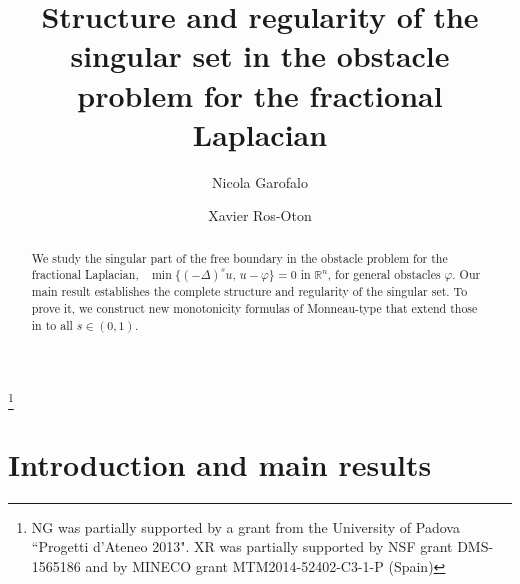 \documentclass[11pt]{amsart}
\theoremstyle{plain}
\numberwithin{equation}{section}
\begin{document}
\title[Regularity of the singular set in the fractional obstacle problem]
{Structure and regularity of the singular set in the obstacle problem for the fractional Laplacian}

\author{Nicola Garofalo}
\address{Dipartimento di Ingegneria Civile, Edile e Ambientale (DICEA) \\ Universit\`a di Padova\\ 35131 Padova, ITALY}


\author{Xavier Ros-Oton}
\address{The University of Texas at Austin, Department of Mathematics, 2515 Speedway, Austin, TX 78751, USA} 

\thanks{NG was partially supported by a grant from the University of Padova ``Progetti d'Ateneo 2013". XR was partially supported by NSF grant DMS-1565186 and by MINECO grant MTM2014-52402-C3-1-P (Spain)}


\maketitle

\begin{abstract}
We study the singular part of the free boundary in the obstacle problem for the fractional Laplacian, \   $\min\bigl\{(-\Delta)^su,\,u-\varphi\bigr\}=0$ in ${\mathbb R}^n$, for general obstacles $\varphi$.
Our main result establishes the complete structure and regularity of the singular set.
To prove it, we construct new monotonicity formulas of Monneau-type that extend those in \cite{GP} to all $s\in(0,1)$.
\end{abstract}

\tableofcontents

\section{Introduction and main results}
\end{document}
